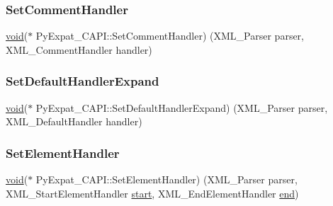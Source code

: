 \subsubsection{\texorpdfstring{SetCommentHandler}{SetCommentHandler}}
{\footnotesize\ttfamily \mbox{\hyperlink{_s_d_l__opengles2__gl2ext_8h_ae5d8fa23ad07c48bb609509eae494c95}{void}}($\ast$ Py\+Expat\+\_\+\+C\+A\+P\+I\+::\+Set\+Comment\+Handler) (X\+M\+L\+\_\+\+Parser parser, X\+M\+L\+\_\+\+Comment\+Handler handler)}

\mbox{\label{struct_py_expat___c_a_p_i_a0bee5d83ab5e9eb578ffb92cd60f8043}} 
\subsubsection{\texorpdfstring{SetDefaultHandlerExpand}{SetDefaultHandlerExpand}}
{\footnotesize\ttfamily \mbox{\hyperlink{_s_d_l__opengles2__gl2ext_8h_ae5d8fa23ad07c48bb609509eae494c95}{void}}($\ast$ Py\+Expat\+\_\+\+C\+A\+P\+I\+::\+Set\+Default\+Handler\+Expand) (X\+M\+L\+\_\+\+Parser parser, X\+M\+L\+\_\+\+Default\+Handler handler)}

\mbox{\label{struct_py_expat___c_a_p_i_a53fc65a60b9dae1d652221e2dfdeb4d0}} 
\subsubsection{\texorpdfstring{SetElementHandler}{SetElementHandler}}
{\footnotesize\ttfamily \mbox{\hyperlink{_s_d_l__opengles2__gl2ext_8h_ae5d8fa23ad07c48bb609509eae494c95}{void}}($\ast$ Py\+Expat\+\_\+\+C\+A\+P\+I\+::\+Set\+Element\+Handler) (X\+M\+L\+\_\+\+Parser parser, X\+M\+L\+\_\+\+Start\+Element\+Handler \mbox{\hyperlink{_s_d_l__opengl_8h_ac55adc720a3098c1b454d2a4647f4361}{start}}, X\+M\+L\+\_\+\+End\+Element\+Handler \mbox{\hyperlink{_s_d_l__opengl_8h_a432111147038972f06e049e18a837002}{end}})}

\mbox{\label{struct_py_expat___c_a_p_i_ad9e94c45149136ca717b975acc06a127}} 

